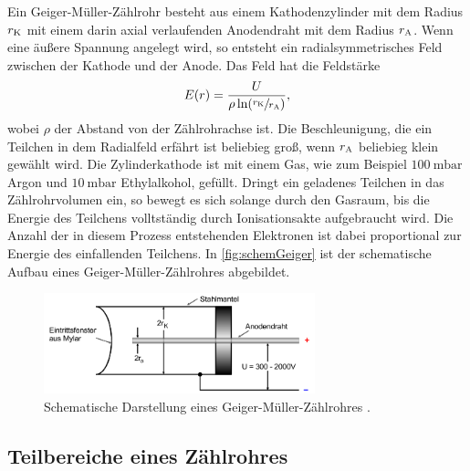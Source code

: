 Ein Geiger-Müller-Zählrohr besteht aus einem Kathodenzylinder mit dem Radius $r_{\text K}$ mit einem darin axial verlaufenden Anodendraht mit dem Radius $r_{\text A}$.
Wenn eine äußere Spannung angelegt wird, so entsteht ein radialsymmetrisches Feld zwischen der Kathode und der Anode.
Das Feld hat die Feldstärke
\begin{align}
    E(r)=\frac{U}{\rho\ln(\sfrac{r_{\text K}}{r_{\text A}})},
\end{align}
wobei $\rho$ der Abstand von der Zählrohrachse ist.
Die Beschleunigung, die ein Teilchen in dem Radialfeld erfährt ist beliebieg groß, wenn $r_{\text A}$ beliebieg klein gewählt wird. \newline
Die Zylinderkathode ist mit einem Gas, wie zum Beispiel $\SI{100}{\milli\bar}$ Argon und $\SI{10}{\milli\bar}$ Ethylalkohol, gefüllt. Dringt ein geladenes Teilchen
in das Zählrohrvolumen ein, so bewegt es sich solange durch den Gasraum, bis die Energie des Teilchens volltständig durch Ionisationsakte aufgebraucht wird. Die Anzahl
der in diesem Prozess entstehenden Elektronen ist dabei proportional zur Energie des einfallenden Teilchens.
In \autoref{fig:schemGeiger} ist der schematische Aufbau eines Geiger-Müller-Zählrohres abgebildet.
\begin{figure}[H]
    \centering
    \includegraphics[width=0.7\textwidth]{data/zaehlrohr.png}
    \caption{Schematische Darstellung eines Geiger-Müller-Zählrohres \cite{Anleitung703}.}
    \label{fig:schemGeiger}
\end{figure}


\subsection{Teilbereiche eines Zählrohres}
\label{subsec:TheoVerlauf}


